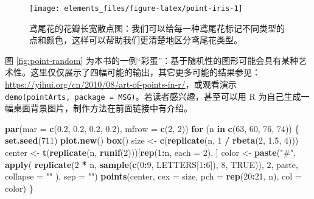 \documentclass[
  b5paper,
  UTF8,twoside]{book}
\newenvironment{Shaded}{\begin{snugshade}}{\end{snugshade}}
\newcommand{\AttributeTok}[1]{\textcolor[rgb]{0.13,0.29,0.53}{#1}}
\newcommand{\ConstantTok}[1]{\textcolor[rgb]{0.56,0.35,0.01}{#1}}
\newcommand{\ControlFlowTok}[1]{\textcolor[rgb]{0.13,0.29,0.53}{\textbf{#1}}}
\newcommand{\DecValTok}[1]{\textcolor[rgb]{0.00,0.00,0.81}{#1}}
\newcommand{\FloatTok}[1]{\textcolor[rgb]{0.00,0.00,0.81}{#1}}
\newcommand{\FunctionTok}[1]{\textcolor[rgb]{0.13,0.29,0.53}{\textbf{#1}}}
\newcommand{\NormalTok}[1]{#1}
\newcommand{\OtherTok}[1]{\textcolor[rgb]{0.56,0.35,0.01}{#1}}
\newcommand{\SpecialCharTok}[1]{\textcolor[rgb]{0.81,0.36,0.00}{\textbf{#1}}}
\newcommand{\StringTok}[1]{\textcolor[rgb]{0.31,0.60,0.02}{#1}}
\begin{document}
\begin{figure}

{\centering \texttt{[image: elements\_files/figure-latex/point-iris-1]} 

}

\caption[鸢尾花的花瓣长宽散点图 ]{鸢尾花的花瓣长宽散点图：我们可以给每一种鸢尾花标记不同类型的点和颜色，这样可以帮助我们更清楚地区分鸢尾花类型。}\label{fig:point-iris}
\end{figure}

图 \ref{fig:point-random} 为本书的一例``彩蛋''：基于随机性的图形可能会具有某种艺术性。这里仅仅展示了四幅可能的输出，其它更多可能的结果参见：\url{https://yihui.org/cn/2010/08/art-of-points-in-r/}，或观看演示 \texttt{demo(\textquotesingle{}pointArts\textquotesingle{},\ package\ =\ \textquotesingle{}MSG\textquotesingle{})}。若读者感兴趣，甚至可以用 R 为自己生成一幅桌面背景图片，制作方法在前面链接中有介绍。

\begin{Shaded}
\begin{Highlighting}[]
\FunctionTok{par}\NormalTok{(}\AttributeTok{mar =} \FunctionTok{c}\NormalTok{(}\FloatTok{0.2}\NormalTok{, }\FloatTok{0.2}\NormalTok{, }\FloatTok{0.2}\NormalTok{, }\FloatTok{0.2}\NormalTok{), }\AttributeTok{mfrow =} \FunctionTok{c}\NormalTok{(}\DecValTok{2}\NormalTok{, }\DecValTok{2}\NormalTok{))}
\ControlFlowTok{for}\NormalTok{ (n }\ControlFlowTok{in} \FunctionTok{c}\NormalTok{(}\DecValTok{63}\NormalTok{, }\DecValTok{60}\NormalTok{, }\DecValTok{76}\NormalTok{, }\DecValTok{74}\NormalTok{)) \{}
  \FunctionTok{set.seed}\NormalTok{(}\DecValTok{711}\NormalTok{)}
  \FunctionTok{plot.new}\NormalTok{()}
  \FunctionTok{box}\NormalTok{()}
\NormalTok{  size }\OtherTok{\textless{}{-}} \FunctionTok{c}\NormalTok{(}\FunctionTok{replicate}\NormalTok{(n, }\DecValTok{1} \SpecialCharTok{/} \FunctionTok{rbeta}\NormalTok{(}\DecValTok{2}\NormalTok{, }\FloatTok{1.5}\NormalTok{, }\DecValTok{4}\NormalTok{)))}
\NormalTok{  center }\OtherTok{\textless{}{-}} \FunctionTok{t}\NormalTok{(}\FunctionTok{replicate}\NormalTok{(n, }\FunctionTok{runif}\NormalTok{(}\DecValTok{2}\NormalTok{)))[}\FunctionTok{rep}\NormalTok{(}\DecValTok{1}\SpecialCharTok{:}\NormalTok{n, }\AttributeTok{each =} \DecValTok{2}\NormalTok{), ]}
\NormalTok{  color }\OtherTok{\textless{}{-}} \FunctionTok{paste}\NormalTok{(}\StringTok{"\#"}\NormalTok{, }\FunctionTok{apply}\NormalTok{(}
    \FunctionTok{replicate}\NormalTok{(}\DecValTok{2} \SpecialCharTok{*}\NormalTok{ n, }\FunctionTok{sample}\NormalTok{(}\FunctionTok{c}\NormalTok{(}\DecValTok{0}\SpecialCharTok{:}\DecValTok{9}\NormalTok{, LETTERS[}\DecValTok{1}\SpecialCharTok{:}\DecValTok{6}\NormalTok{]), }\DecValTok{8}\NormalTok{, }\ConstantTok{TRUE}\NormalTok{)), }\DecValTok{2}\NormalTok{, paste,}
    \AttributeTok{collapse =} \StringTok{""}
\NormalTok{  ), }\AttributeTok{sep =} \StringTok{""}\NormalTok{)}
  \FunctionTok{points}\NormalTok{(center, }\AttributeTok{cex =}\NormalTok{ size, }\AttributeTok{pch =} \FunctionTok{rep}\NormalTok{(}\DecValTok{20}\SpecialCharTok{:}\DecValTok{21}\NormalTok{, n), }\AttributeTok{col =}\NormalTok{ color)}
\NormalTok{\}}
\end{Highlighting}
\end{Shaded}
\end{document}

